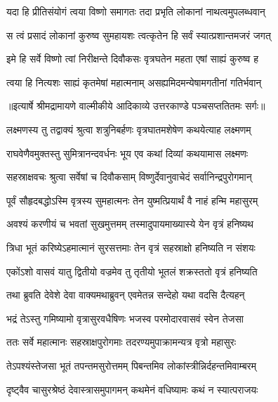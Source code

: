 \twolineshloka
{यदा हि प्रीतिसंयोगं त्वया विष्णो समागतः}
{तदा प्रभृति लोकानां नाथत्वमुपलब्धवान्} %

\twolineshloka
{स त्वं प्रसादं लोकानां कुरुष्व सुमहायशः}
{त्वत्कृतेन हि सर्वं स्यात्प्रशान्तमजरं जगत्} %

\twolineshloka
{इमे हि सर्वे विष्णो त्वां निरीक्षन्ते दिवौकसः}
{वृत्रघतेन महता एषां साह्यं कुरुष्व ह} %

\twolineshloka
{त्वया हि नित्यशः साह्यं कृतमेषां महात्मनाम्}
{असह्यमिदमन्येषामगतीनां गतिर्भवान्} %


{॥इत्यार्षे श्रीमद्रामायणे वाल्मीकीये आदिकाव्ये उत्तरकाण्डे पञ्चसप्ततितमः सर्गः॥}


\twolineshloka
{लक्ष्मणस्य तु तद्वाक्यं श्रुत्वा शत्रुनिबर्हणः}
{वृत्रघातमशेषेण कथयेत्याह लक्ष्मणम्} %

\twolineshloka
{राघवेणैवमुक्तस्तु सुमित्रानन्दवर्धनः}
{भूय एव कथां दिव्यां कथयामास लक्ष्मणः} %

\twolineshloka
{सहस्राक्षवचः श्रुत्वा सर्वेषां च दिवौकसाम्}
{विष्णुर्देवानुवाचेदं सर्वानिन्द्रपुरोगमान्} %

\twolineshloka
{पूर्वं सौहृदबद्धोऽस्मि वृत्रस्य सुमहात्मनः}
{तेन युष्मत्प्रियार्थं वै नाहं हन्मि महासुरम्} %

\twolineshloka
{अवश्यं करणीयं च भवतां सुखमुत्तमम्}
{तस्मादुपायमाख्यास्ये येन वृत्रं हनिष्यथ} %

\twolineshloka
{त्रिधा भूतं करिष्येऽहमात्मानं सुरसत्तमाः}
{तेन वृत्रं सहस्राक्षो हनिष्यति न संशयः} %

\twolineshloka
{एकोंऽशो वासवं यातु द्वितीयो वज्रमेव तु}
{तृतीयो भूतलं शक्रस्ततो वृत्रं हनिष्यति} %

\twolineshloka
{तथा ब्रुवति देवेशे देवा वाक्यमथाब्रुवन्}
{एवमेतन्न सन्देहो यथा वदसि दैत्यहन्} %

\twolineshloka
{भद्रं तेऽस्तु गमिष्यामो वृत्रासुरवधैषिणः}
{भजस्व परमोदारवासवं स्वेन तेजसा} %

\twolineshloka
{ततः सर्वे महात्मानः सहस्राक्षपुरोगमाः}
{तदरण्यमुपाक्रामन्यत्र वृत्रो महासुरः} %

\twolineshloka
{तेऽपश्यंस्तेजसा भूतं तपन्तमसुरोत्तमम्}
{पिबन्तमिव लोकांस्त्रीन्निर्दहन्तमिवाम्बरम्} %

\twolineshloka
{दृष्ट्वैव चासुरश्रेष्ठं देवास्त्रासमुपागमन्}
{कथमेनं वधिष्यामः कथं न स्यात्पराजयः} %


